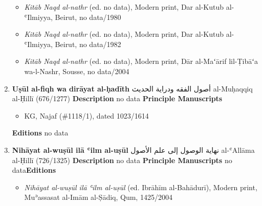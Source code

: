 \documentclass{article}
\begin{document}
\begin{enumerate}
\begin{itemize}
        \item \emph{Kitāb Naqd al-nathr} (ed. no data), Modern print, Dar al-Kutub al-ʿIlmiyya, Beirut, no data/1980
        
        \item \emph{Kitāb Naqd al-nathr} (ed. no data), Modern print, Dar al-Kutub al-ʿIlmiyya, Beirut, no data/1982
        
        \item \emph{Kitāb Naqd al-nathr} (ed. no data), Modern print, Dār al-Maʻārif lil-Ṭibāʻa wa-l-Nashr, Sousse, no data/2004
        \end{itemize}

      \item \textbf{Uṣūl al-fiqh wa dirāyat al-ḥadīth}
        \newline
        \textarabic{أصول الفقه ودراية الحديث}
        \newline
        al-Muḥaqqiq al-Ḥillī
        \newline
        (676/1277)
        \newline
        \newline
        \textbf{Description}
        \newline	
        no data
        \newline
        \newline
    \textbf{Principle Manuscripts}
\begin{itemize}
    \item KG, Najaf (\#1118/1), dated 1023/1614
    \end{itemize}
\textbf{Editions}
\newline
no data\newline
      \item \textbf{Nihāyat al-wuṣūl ilā ʿilm al-uṣūl}
        \newline
        \textarabic{نهاية الوصول إلى علم الأصول}
        \newline
        al-ʿAllāma al-Ḥillī
        \newline
        (726/1325)
        \newline
        \newline
        \textbf{Description}
        \newline	
        no data
        \newline
        \newline
    \textbf{Principle Manuscripts}
\newline
no data\newline\textbf{Editions}
\begin{itemize}
        \item \emph{Nihāyat al-wuṣūl ilā ʿilm al-uṣūl} (ed. Ibrāhīm al-Bahādurī), Modern print, Muʾassasat al-Imām al-Ṣādiq, Qum, 1425/2004
        

\end{itemize}
\end{enumerate}
\end{document}
